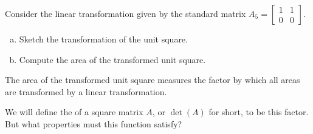 \begin{applicationActivities}
\begin{activity}{5}
Consider the linear transformation given by the standard matrix
 $A_5 = \begin{bmatrix} 1 & 1 \\ 0 & 0 \end{bmatrix}$.

\begin{enumerate}[(a)]
\item Sketch the transformation of the unit square.
\item Compute the area of the transformed unit square.
\end{enumerate}
\end{activity}


\begin{remark}
The area of the transformed unit square measures the factor by which
all areas are transformed by a linear transformation.

We will define the  of a square matrix \(A\),
or \(\det(A)\) for short, to be this factor. But
what properties must this function satisfy?
\end{remark}


\end{applicationActivities}
